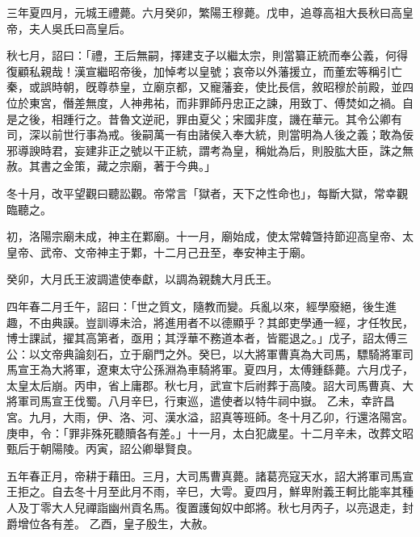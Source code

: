 \begin{pinyinscope}
 
 
 
 三年夏四月，元城王禮薨。六月癸卯，繁陽王穆薨。戊申，追尊高祖大長秋曰高皇帝，夫人吳氏曰高皇后。
 
 
 
 
 秋七月，詔曰：「禮，王后無嗣，擇建支子以繼太宗，則當纂正統而奉公義，何得復顧私親哉！漢宣繼昭帝後，加悼考以皇號；哀帝以外藩援立，而董宏等稱引亡秦，或誤時朝，旣尊恭皇，立廟京都，又寵藩妾，使比長信，敘昭穆於前殿，並四位於東宮，僭差無度，人神弗祐，而非罪師丹忠正之諫，用致丁、傅焚如之禍。自是之後，相踵行之。昔魯文逆祀，罪由夏父；宋國非度，譏在華元。其令公卿有司，深以前世行事為戒。後嗣萬一有由諸侯入奉大統，則當明為人後之義；敢為佞邪導諛時君，妄建非正之號以干正統，謂考為皇，稱妣為后，則股肱大臣，誅之無赦。其書之金策，藏之宗廟，著于今典。」
 
 
 
 
 冬十月，改平望觀曰聽訟觀。帝常言「獄者，天下之性命也」，每斷大獄，常幸觀臨聽之。
 
 
初，洛陽宗廟未成，神主在鄴廟。十一月，廟始成，使太常韓曁持節迎高皇帝、太皇帝、武帝、文帝神主于鄴，十二月己丑至，奉安神主于廟。
 
 
 
 
 癸卯，大月氏王波調遣使奉獻，以調為親魏大月氏王。
 
 
四年春二月壬午，詔曰：「世之質文，隨教而變。兵亂以來，經學廢絕，後生進趣，不由典謨。豈訓導未洽，將進用者不以德顯乎？其郎吏學通一經，才任牧民，博士課試，擢其高第者，亟用；其浮華不務道本者，皆罷退之。」戊子，詔太傅三公：以文帝典論刻石，立于廟門之外。癸巳，以大將軍曹真為大司馬，驃騎將軍司馬宣王為大將軍，遼東太守公孫淵為車騎將軍。夏四月，太傅鍾繇薨。六月戊子，太皇太后崩。丙申，省上庸郡。秋七月，武宣卞后祔葬于高陵。詔大司馬曹真、大將軍司馬宣王伐蜀。八月辛巳，行東巡，遣使者以特牛祠中嶽。
 乙未，幸許昌宮。九月，大雨，伊、洛、河、漢水溢，詔真等班師。冬十月乙卯，行還洛陽宮。庚申，令：「罪非殊死聽贖各有差。」十一月，太白犯歲星。十二月辛未，改葬文昭甄后于朝陽陵。丙寅，詔公卿舉賢良。
 
 
五年春正月，帝耕于藉田。三月，大司馬曹真薨。諸葛亮寇天水，詔大將軍司馬宣王拒之。自去冬十月至此月不雨，辛巳，大雩。夏四月，鮮卑附義王軻比能率其種人及丁零大人兒禪詣幽州貢名馬。復置護匈奴中郎將。秋七月丙子，以亮退走，封爵增位各有差。
 乙酉，皇子殷生，大赦。
 

\end{pinyinscope}
